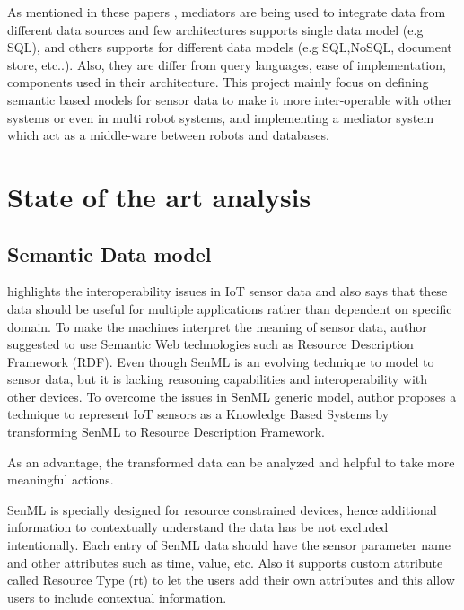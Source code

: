 \documentclass[12pt]{article}
\begin{document}
As mentioned in these papers \cite{ahmed1991pegasus,fahl1993amos,arens1996query,chawathe1994tsimmis,chawathe1994tsimmis,shoens1993rufus}, mediators are being used to integrate data from different data sources and few architectures supports single data model (e.g SQL), and others supports for different data models (e.g SQL,NoSQL, document store, etc..). Also, they are differ from query languages, ease of implementation, components used in their architecture. This project mainly focus on defining semantic based models for sensor data to make it more inter-operable with other systems or even in multi robot systems, and implementing a mediator system which act as a middle-ware between robots and databases. 

\section{State of the art analysis}

\subsection{Semantic Data model}
\citet{su2014connecting} highlights the interoperability issues in IoT sensor data and also says that these data should be useful for multiple applications rather than dependent on specific domain. To make the machines interpret the meaning of sensor data, author suggested to use Semantic Web technologies such as Resource Description Framework (RDF). Even though SenML is an evolving technique to model to sensor data, but it is lacking reasoning capabilities and interoperability with other devices. To overcome the issues in SenML generic model, author proposes a technique to represent IoT sensors as a Knowledge Based Systems by transforming SenML to Resource Description Framework. 

As an advantage, the transformed data can be analyzed and helpful to take more meaningful actions. 

SenML is specially designed for resource constrained devices, hence additional information to contextually understand the data has be not excluded intentionally. Each entry of SenML data should have the sensor parameter name and other attributes such as time, value, etc. Also it supports custom attribute called Resource Type (rt) to let the users add their own attributes and this allow users to include contextual information.
\end{document}
